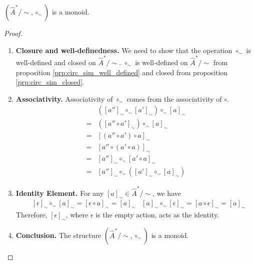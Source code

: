 \begin{proposition}
    $(\hat{A}^{\ast}/\sim, \circ_{\sim})$ is a monoid.
\end{proposition}
\begin{proof}
\begin{enumerate}[(1)]
    \item \textbf{Closure and well-definedness.}
    We need to show that the operation $\circ_{\sim}$ is well-defined and closed on $\hat{A}^{\ast}/\sim$.
    $\circ_{\sim}$ is well-defined on $\hat{A}^{\ast}/\sim$ from proposition \ref{prp:circ_sim_well_defined} and closed from proposition \ref{prp:circ_sim_closed}.

    \item \textbf{Associativity.}
    Associativity of $\circ_{\sim}$ comes from the associativity of $\circ$.
    \begin{align}
    &([a'']_{\sim} \circ_{\sim} [a']_{\sim}) \circ_{\sim} [a]_{\sim} \\
    ={}& ([a'' \circ a']_{\sim}) \circ_{\sim} [a]_{\sim} \\
    ={}& [ (a'' \circ a') \circ a ]_{\sim} \\
    ={}& [ a'' \circ (a' \circ a) ]_{\sim} \\
    ={}& [a'']_{\sim} \circ_{\sim} [a' \circ a]_{\sim} \\
    ={}& [a'']_{\sim} \circ_{\sim} ([a']_{\sim} \circ_{\sim} [a]_{\sim})
    \end{align}

    \item \textbf{Identity Element.}
    For any $[a]_{\sim} \in \hat{A}^{\ast}/\sim$, we have
    \begin{align}
    &[\epsilon]_{\sim} \circ_{\sim} [a]_{\sim} = [\epsilon \circ a]_{\sim} = [a]_{\sim}
    &[a]_{\sim} \circ_{\sim} [\epsilon]_{\sim} = [a \circ \epsilon]_{\sim} = [a]_{\sim}
    \end{align}
    Therefore, $[\epsilon]_{\sim}$, where $\epsilon$ is the empty action, acts as the identity.

    \item \textbf{Conclusion.}
    The structure $(\hat{A}^{\ast}/\sim, \circ_{\sim})$ is a monoid.
\end{enumerate}
\end{proof}

